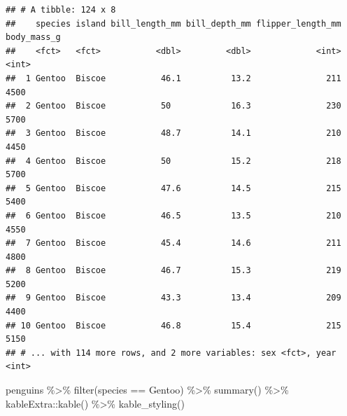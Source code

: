 \documentclass[
]{article}
\newenvironment{Shaded}{\begin{snugshade}}{\end{snugshade}}
\newcommand{\FunctionTok}[1]{\textcolor[rgb]{0.00,0.00,0.00}{#1}}
\newcommand{\NormalTok}[1]{#1}
\newcommand{\SpecialCharTok}[1]{\textcolor[rgb]{0.00,0.00,0.00}{#1}}
\newcommand{\StringTok}[1]{\textcolor[rgb]{0.31,0.60,0.02}{#1}}
\begin{document}
\begin{verbatim}
## # A tibble: 124 x 8
##    species island bill_length_mm bill_depth_mm flipper_length_mm body_mass_g
##    <fct>   <fct>           <dbl>         <dbl>             <int>       <int>
##  1 Gentoo  Biscoe           46.1          13.2               211        4500
##  2 Gentoo  Biscoe           50            16.3               230        5700
##  3 Gentoo  Biscoe           48.7          14.1               210        4450
##  4 Gentoo  Biscoe           50            15.2               218        5700
##  5 Gentoo  Biscoe           47.6          14.5               215        5400
##  6 Gentoo  Biscoe           46.5          13.5               210        4550
##  7 Gentoo  Biscoe           45.4          14.6               211        4800
##  8 Gentoo  Biscoe           46.7          15.3               219        5200
##  9 Gentoo  Biscoe           43.3          13.4               209        4400
## 10 Gentoo  Biscoe           46.8          15.4               215        5150
## # ... with 114 more rows, and 2 more variables: sex <fct>, year <int>
\end{verbatim}

\begin{Shaded}
\begin{Highlighting}[]
\NormalTok{penguins }\SpecialCharTok{\%\textgreater{}\%} 
  \FunctionTok{filter}\NormalTok{(species }\SpecialCharTok{==} \StringTok{\textquotesingle{}Gentoo\textquotesingle{}}\NormalTok{) }\SpecialCharTok{\%\textgreater{}\%} 
  \FunctionTok{summary}\NormalTok{() }\SpecialCharTok{\%\textgreater{}\%} 
\NormalTok{  kableExtra}\SpecialCharTok{::}\FunctionTok{kable}\NormalTok{() }\SpecialCharTok{\%\textgreater{}\%} 
  \FunctionTok{kable\_styling}\NormalTok{()}
\end{Highlighting}
\end{Shaded}
\end{document}
